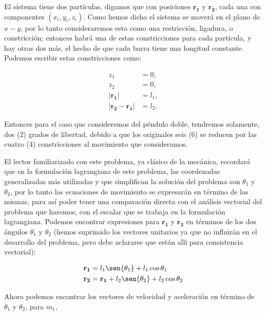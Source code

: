\documentclass[a4paper,10pt]{article}
\numberwithin{equation}{section}
\begin{document}
\vspace{.3cm}

El sistema tiene dos partículas, digamos que con posiciones $\mathbf{r_1}$ y $\mathbf{r_2}$,
cada una con componentes $(x_i,y_i,z_i)$. Como hemos dicho el sistema se moverá 
en el plano de $x-y$, por lo tanto consideraremos esto como una restricción, ligadura,
o constricción; entonces habrá una de estas constricciones para cada partícula, y 
hay otras dos más, el hecho de que cada barra tiene una longitud constante. Podemos 
escribir estas constricciones como:

\begin{align}
 z_1 &= 0, \\
 z_2 &= 0, \\
 |\mathbf{r_1}| &= l_1, \\
 |\mathbf{r_2} - \mathbf{r_1}| &= l_2.
 \label{eq:pendu1}
\end{align}

Entonces para el caso que consideremos del péndulo doble, tendremos solamente, dos (2)
grados de libertad, debido a que los originales seis (6) se reducen por las cuatro (4)
constricciones al movimiento que consideramos. 

\vspace{.3cm}

El lector familiarizado con este problema, ya clásico de la mecánica, recordará que en 
la formulación lagrangiana de este problema, las coordenadas generalizadas más utilizadas
y que simplifican la solución del problema son $\theta_1$ y $\theta_2$, por lo tanto
las ecuaciones de movimiento se expresarán en término de las mismas, para así poder tener 
una comparación directa con el análisis vectorial del problema que haremos, con el escalar
que se trabaja en la formulación lagrangiana. Podemos encontrar expresiones para $\mathbf{r_1}$ y $\mathbf{r_2}$ en términos 
de los dos ángulos $\theta_1$ y $\theta_2$ (hemos suprimido los vectores unitarios 
ya que no influirán en el desarrollo del problema, pero debe aclararse que están allí
para consistencia vectorial):

\begin{align}
 \mathbf{r_1} &= l_1\sen{\theta_1} + l_1\cos{\theta_1} \\
 \mathbf{r_2} &= \mathbf{r_1} +  l_2\sen{\theta_2} + l_2\cos{\theta_2}
 \label{eq:pendu2}
\end{align}

Ahora podemos encontrar los vectores de velocidad y aceleración en término de $\theta_1$ y $\theta_2$,
para $m_1$,
\end{document}
